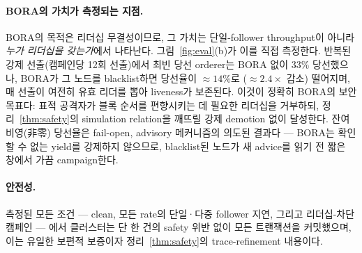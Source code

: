 \paragraph*{BORA의 가치가 측정되는 지점.}
BORA의 목적은 리더십 무결성이므로, 그 가치는 단일-follower
throughput이 아니라 \emph{누가 리더십을 갖는가}에서 나타난다.
그림~\ref{fig:eval}(b)가 이를 직접 측정한다. 반복된 강제
선출(캠페인당 12회 선출)에서 최빈 당선 orderer는 BORA 없이 $33\%$
당선했으나, BORA가 그 노드를 blacklist하면 당선율이 $\approx 14\%$로
($\approx 2.4\times$ 감소) 떨어지며, 매 선출이 여전히 유효 리더를
뽑아 liveness가 보존된다. 이것이 정확히 BORA의 보안 목표다: 표적
공격자가 블록 순서를 편향시키는 데 필요한 리더십을 거부하되,
정리~\ref{thm:safety}의 simulation relation을 깨뜨릴 강제 demotion
없이 달성한다. 잔여 비영(非零) 당선율은 fail-open, advisory
메커니즘의 의도된 결과다 --- BORA는 확인할 수 없는 yield를 강제하지
않으므로, blacklist된 노드가 새 advice를 읽기 전 짧은 창에서 가끔
campaign한다.

\paragraph*{안전성.}
측정된 모든 조건 --- clean, 모든 rate의 단일·다중 follower 지연,
그리고 리더십-차단 캠페인 --- 에서 클러스터는 단 한 건의 safety
위반 없이 모든 트랜잭션을 커밋했으며, 이는 유일한 보편적 보증이자
정리~\ref{thm:safety}의 trace-refinement 내용이다.
